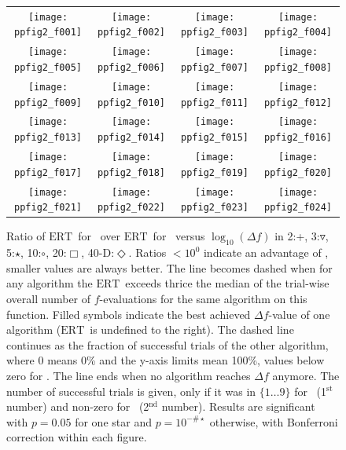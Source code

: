 \documentclass{article}
\newcommand{\ERT}{\ensuremath{\mathrm{ERT}}}
\newcommand{\Df}{\ensuremath{\Delta f}}
\begin{document}
\begin{figure}
\centering
\begin{tabular}{@{}c@{}c@{}c@{}c@{}}
\texttt{[image: ppfig2\_f001]}&
\texttt{[image: ppfig2\_f002]}&
\texttt{[image: ppfig2\_f003]}&
\texttt{[image: ppfig2\_f004]}\\
\texttt{[image: ppfig2\_f005]}&
\texttt{[image: ppfig2\_f006]}&
\texttt{[image: ppfig2\_f007]}&
\texttt{[image: ppfig2\_f008]}\\
\texttt{[image: ppfig2\_f009]}&
\texttt{[image: ppfig2\_f010]}&
\texttt{[image: ppfig2\_f011]}&
\texttt{[image: ppfig2\_f012]}\\
\texttt{[image: ppfig2\_f013]}&
\texttt{[image: ppfig2\_f014]}&
\texttt{[image: ppfig2\_f015]}&
\texttt{[image: ppfig2\_f016]}\\
\texttt{[image: ppfig2\_f017]}&
\texttt{[image: ppfig2\_f018]}&
\texttt{[image: ppfig2\_f019]}&
\texttt{[image: ppfig2\_f020]}\\
\texttt{[image: ppfig2\_f021]}&
\texttt{[image: ppfig2\_f022]}&
\texttt{[image: ppfig2\_f023]}&
\texttt{[image: ppfig2\_f024]}
\end{tabular}
\vspace*{-0.2cm}
\caption{\label{fig:ERTratiographs}Ratio of \ERT\ for \algorithmB\ over \ERT\ for
\algorithmA\ versus $\log_{10}(\Df)$ in
  2:{\color{cyan}+},
  3:{\color{green!45!black}$\triangledown$},
  5:{\color{blue}$\star$}, 
 10:$\circ$, 
 20:{\color{red}$\Box$}, 
 40-D:{\color{magenta}$\Diamond$}.
Ratios $<10^0$ indicate an advantage of \algorithmB, smaller
values are always better. The line becomes dashed when for any algorithm the \ERT\ exceeds thrice the median
of the trial-wise overall number of $f$-evaluations for the same algorithm on this function.
Filled symbols indicate the best achieved $\Df$-value of one algorithm (\ERT\ is undefined to the right).
The dashed line continues as the fraction of successful trials of the other
algorithm, where 0 means 0\% and the y-axis limits mean 100\%, values below
zero for \algorithmB. The line ends when no algorithm reaches $\Df$ anymore. 
The number of successful trials is given, only if it was in $\{1\dots9\}$ for
\algorithmB\ (1$^{\textrm{st}}$ number) and non-zero for \algorithmA\ (2$^{\textrm{nd}}$ number).
Results are significant with $p=0.05$ for one star and $p=10^{-\#\star}$
otherwise, with Bonferroni correction within each figure.}
\end{figure}
\end{document}
